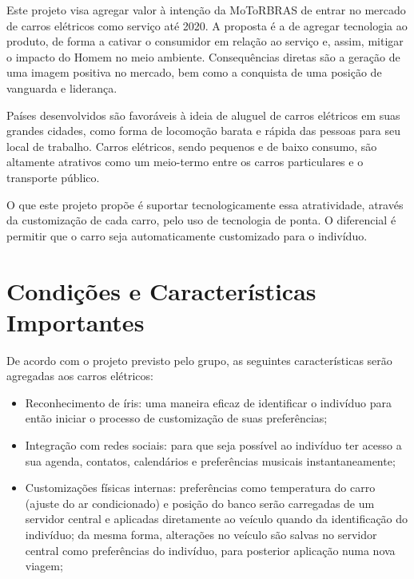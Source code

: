 \documentclass[12pt,journal,compsoc]{IEEEtran}
\begin{document}
Este projeto visa agregar valor à intenção da MoToRBRAS de entrar no mercado de carros elétricos como serviço até 2020. A proposta é a de agregar tecnologia ao produto, de forma a cativar o consumidor em relação ao serviço e, assim, mitigar o impacto do Homem no meio ambiente. Consequências diretas são a geração de uma imagem positiva no mercado, bem como a conquista de uma posição de vanguarda e liderança. 

Países desenvolvidos são favoráveis à ideia de aluguel de carros elétricos em suas grandes cidades, como forma de locomoção barata e rápida das pessoas para seu local de trabalho. Carros elétricos, sendo pequenos e de baixo consumo, são altamente atrativos como um meio-termo entre os carros particulares e o transporte público. 

O que este projeto propõe é suportar tecnologicamente essa atratividade, através da customização de cada carro, pelo uso de tecnologia de ponta. O diferencial é permitir que o carro seja automaticamente customizado para o indivíduo. 


\section{Condições e Características Importantes}

De acordo com o projeto previsto pelo grupo, as seguintes características serão agregadas aos carros elétricos:

\begin{itemize}

\item Reconhecimento de íris: uma maneira eficaz de identificar o indivíduo para então iniciar o processo de customização de suas preferências;

\item Integração com redes sociais: para que seja possível ao indivíduo ter acesso a sua agenda, contatos, calendários e preferências musicais instantaneamente; 

\item Customizações físicas internas: preferências como temperatura do carro (ajuste do ar condicionado) e posição do banco serão carregadas de um servidor central e aplicadas diretamente ao veículo quando da identificação do indivíduo; da mesma forma, alterações no veículo são salvas no servidor central como preferências do indivíduo, para posterior aplicação numa nova viagem;

\end{itemize}
\end{document}
